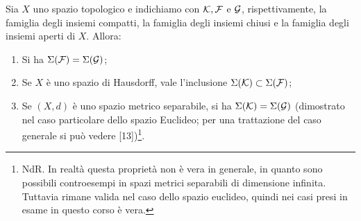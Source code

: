 \begin{proposition}[$**$]\label{prop: 1.3 boreliani} Sia $X$ uno spazio topologico e indichiamo con $\mathcal{K}, \mathcal{F}$ e $\mathcal{G}$, rispettivamente, la famiglia degli insiemi compatti, la famiglia degli insiemi chiusi e la famiglia degli insiemi aperti di $X$. Allora:
  \begin{enumerate}
    \item Si ha $\Sigma(\mathcal{F})=\Sigma(\mathcal{G})$;

    \item Se $X$ è uno spazio di Hausdorff, vale l'inclusione $\Sigma(\mathcal{K}) \subset \Sigma(\mathcal{F})$;

    \item Se $(X, d)$ è uno spazio metrico separabile, si ha $\Sigma(\mathcal{K})=\Sigma(\mathcal{G})$ (dimostrato nel caso particolare dello spazio Euclideo; per una trattazione del caso generale si può vedere [13])\footnote{NdR. In realtà questa proprietà non è vera in generale, in quanto sono possibili controesempi in spazi metrici separabili di dimensione infinita. Tuttavia rimane valida nel caso dello spazio euclideo, quindi nei casi presi in esame in questo corso è vera. }.
  \end{enumerate}
\end{proposition}
